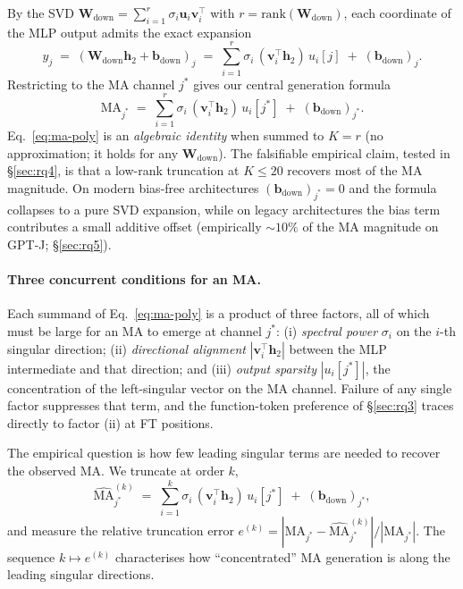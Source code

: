 \documentclass{article}
\newcommand{\Wdown}{\mathbf{W}_{\text{down}}}
\newcommand{\ma}{\mathrm{MA}}
\begin{document}
By the SVD $\Wdown = \sum_{i=1}^{r} \sigma_i \mathbf{u}_i \mathbf{v}_i^{\top}$
with $r = \text{rank}(\Wdown)$, each coordinate of the MLP output admits the
exact expansion
\begin{equation}
  \label{eq:exact}
  y_j \;=\; (\Wdown \mathbf{h}_2 + \mathbf{b}_{\text{down}})_j \;=\; \sum_{i=1}^{r} \sigma_i\,(\mathbf{v}_i^{\top}\mathbf{h}_2)\,u_i[j] \;+\; (\mathbf{b}_{\text{down}})_j.
\end{equation}
Restricting to the MA channel $j^{*}$ gives our central generation formula
\begin{equation}
  \label{eq:ma-poly}
  \ma_{j^{*}} \;=\; \sum_{i=1}^{r} \sigma_i\,(\mathbf{v}_i^{\top}\mathbf{h}_2)\,u_i[j^{*}] \;+\; (\mathbf{b}_{\text{down}})_{j^{*}}.
\end{equation}
Eq.~\eqref{eq:ma-poly} is an \emph{algebraic identity} when summed to
$K=r$ (no approximation; it holds for any $\Wdown$). The falsifiable
empirical claim, tested in \S\ref{sec:rq4}, is that a low-rank
truncation at $K\leq 20$ recovers most of the MA magnitude. On modern
bias-free architectures $(\mathbf{b}_{\text{down}})_{j^{*}} = 0$ and the
formula collapses to a pure SVD expansion, while on legacy architectures the
bias term contributes a small additive offset (empirically $\sim 10\%$ of
the MA magnitude on GPT-J; \S\ref{sec:rq5}).

\paragraph{Three concurrent conditions for an MA.}
Each summand of Eq.~\eqref{eq:ma-poly} is a product of three factors, all
of which must be large for an MA to emerge at channel $j^{*}$:
(i) \emph{spectral power} $\sigma_i$ on the $i$-th singular direction;
(ii) \emph{directional alignment} $|\mathbf{v}_i^{\top}\mathbf{h}_2|$
between the MLP intermediate and that direction; and (iii) \emph{output
sparsity} $|u_i[j^{*}]|$, the concentration of the left-singular vector on
the MA channel. Failure of any single factor suppresses that term, and the
function-token preference of \S\ref{sec:rq3} traces directly to
factor (ii) at FT positions.

The empirical question is how few leading singular terms are needed to
recover the observed MA. We truncate at order $k$,
\begin{equation}
  \label{eq:ma-trunc}
  \widehat{\ma}^{(k)}_{j^{*}} \;=\; \sum_{i=1}^{k} \sigma_i\,(\mathbf{v}_i^{\top}\mathbf{h}_2)\,u_i[j^{*}] \;+\; (\mathbf{b}_{\text{down}})_{j^{*}},
\end{equation}
and measure the relative truncation error
$e^{(k)} = |\ma_{j^{*}} - \widehat{\ma}^{(k)}_{j^{*}}| / |\ma_{j^{*}}|$. The
sequence $k \mapsto e^{(k)}$ characterises how ``concentrated'' MA generation
is along the leading singular directions.
\end{document}
